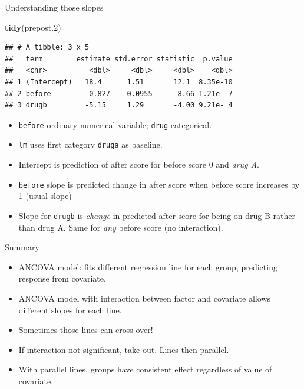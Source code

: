 \documentclass[
  ignorenonframetext,
]{beamer}
\newenvironment{Shaded}{\begin{snugshade}}{\end{snugshade}}
\newcommand{\FloatTok}[1]{\textcolor[rgb]{0.00,0.00,0.81}{#1}}
\newcommand{\KeywordTok}[1]{\textcolor[rgb]{0.13,0.29,0.53}{\textbf{#1}}}
\newcommand{\NormalTok}[1]{#1}
\begin{document}
\begin{frame}[fragile]{Understanding those slopes}
\protect\hypertarget{understanding-those-slopes}{}

\footnotesize

\begin{Shaded}
\begin{Highlighting}[]
\KeywordTok{tidy}\NormalTok{(prepost}\FloatTok{.2}\NormalTok{)}
\end{Highlighting}
\end{Shaded}

\begin{verbatim}
## # A tibble: 3 x 5
##   term        estimate std.error statistic  p.value
##   <chr>          <dbl>     <dbl>     <dbl>    <dbl>
## 1 (Intercept)   18.4      1.51       12.1  8.35e-10
## 2 before         0.827    0.0955      8.66 1.21e- 7
## 3 drugb         -5.15     1.29       -4.00 9.21e- 4
\end{verbatim}

\normalsize

\begin{itemize}
\item
  \texttt{before} ordinary numerical variable; \texttt{drug}
  categorical.
\item
  \texttt{lm} uses first category \texttt{druga} as baseline.
\item
  Intercept is prediction of after score for before score 0 and
  \emph{drug A}.
\item
  \texttt{before} slope is predicted change in after score when before
  score increases by 1 (usual slope)
\item
  Slope for \texttt{drugb} is \emph{change} in predicted after score for
  being on drug B rather than drug A. Same for \emph{any} before score
  (no interaction).
\end{itemize}

\end{frame}

\begin{frame}{Summary}
\protect\hypertarget{summary}{}

\begin{itemize}
\item
  ANCOVA model: fits different regression line for each group,
  predicting response from covariate.
\item
  ANCOVA model with interaction between factor and covariate allows
  different slopes for each line.
\item
  Sometimes those lines can cross over!
\item
  If interaction not significant, take out. Lines then parallel.
\item
  With parallel lines, groups have consistent effect regardless of value
  of covariate.
\end{itemize}

\end{frame}
\end{document}
